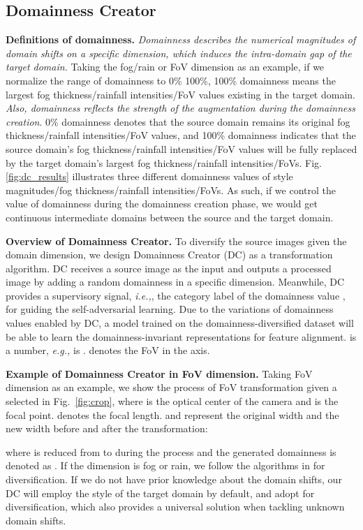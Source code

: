 \documentclass[10pt,journal,compsoc]{IEEEtran}
\begin{document}
\subsection{Domainness Creator}
\label{sec:domainness creator}
\textbf{Definitions of domainness.} \textit{Domainness describes the numerical magnitudes of domain shifts on a specific dimension, which induces the intra-domain gap of the target domain.} 
Taking the fog/rain or FoV dimension as an example,  if we normalize the range of domainness to 0\%  100\%, 100\% domainness means the largest fog thickness/rainfall intensities/FoV values existing in the target domain. \textit{Also, domainness reflects the strength of the augmentation during the domainness creation}. 0\% domainness denotes that the source domain remains its original fog thickness/rainfall intensities/FoV values, and 100\% domainness indicates that the source domain's fog thickness/rainfall intensities/FoV values will be fully replaced by the target domain's largest fog thickness/rainfall intensities/FoVs. Fig. \ref{fig:dc_results} illustrates three different domainness values of style magnitudes/fog thickness/rainfall intensities/FoVs.
As such, if we control the value of domainness during the domainness creation phase, we would get continuous intermediate domains between the source and the target domain. 

\noindent \textbf{Overview of Domainness Creator.} To diversify the source images given the domain dimension,
we design Domainness Creator (DC) as a transformation algorithm. 
DC receives a source image  as the input and outputs a processed image  by adding a random domainness in a specific dimension.
Meanwhile, DC provides a  supervisory signal, \emph{i.e.,}, the category label  of the domainness value ,  for guiding the self-adversarial learning.  Due to the  variations of domainness values enabled by DC, a model trained on the  domainness-diversified dataset will be able to learn the domainness-invariant representations for feature alignment.  is a number, \emph{e.g.,}  is .  denotes the FoV in the  axis.

\noindent \textbf{Example of Domainness Creator in FoV dimension.} Taking FoV dimension as an example, we show the process of FoV transformation given a selected  in Fig.~\ref{fig:crop}, where  is the optical center of the camera and  is the focal point.  denotes the focal length.  and  represent the original width and the new width before and after the transformation: 

where  is  reduced from  to  during the process and the generated domainness is denoted as . 
If the dimension is fog or rain, we follow the algorithms in \cite{FoggyCity,rainy_city} for diversification. If we do not have prior knowledge about the domain shifts, our DC will employ the style of the target domain by default, and adopt \cite{FDA} for diversification, which also provides a universal solution when tackling unknown domain shifts. 
\end{document}
